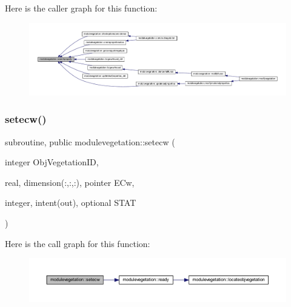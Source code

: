 Here is the caller graph for this function\+:\nopagebreak
\begin{figure}[H]
\begin{center}
\leavevmode
\includegraphics[width=350pt]{namespacemodulevegetation_aaa44ba5345b19bc2d7499a1e5643a52e_icgraph}
\end{center}
\end{figure}
\mbox{\label{namespacemodulevegetation_af9791218901ea10557b2795395421159}} 
\subsubsection{\texorpdfstring{setecw()}{setecw()}}
{\footnotesize\ttfamily subroutine, public modulevegetation\+::setecw (\begin{DoxyParamCaption}\item[{integer}]{Obj\+Vegetation\+ID,  }\item[{real, dimension(\+:,\+:,\+:), pointer}]{E\+Cw,  }\item[{integer, intent(out), optional}]{S\+T\+AT }\end{DoxyParamCaption})}

Here is the call graph for this function\+:\nopagebreak
\begin{figure}[H]
\begin{center}
\leavevmode
\includegraphics[width=350pt]{namespacemodulevegetation_af9791218901ea10557b2795395421159_cgraph}
\end{center}
\end{figure}
\mbox{\label{namespacemodulevegetation_a38d68bd81032a262aeb48e983401e19a}} 
